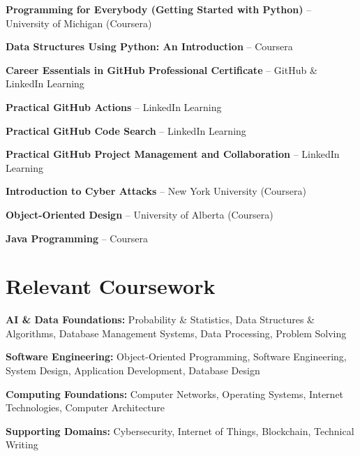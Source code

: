 \documentclass[a4paper,11pt]{article}
\begin{document}
\begin{itemize}[leftmargin=0in, label={}]

\small{

\item{
\textbf{Programming for Everybody (Getting Started with Python)} -- University of Michigan (Coursera)
}

\item{
\textbf{Data Structures Using Python: An Introduction} -- Coursera
}

\item{
\textbf{Career Essentials in GitHub Professional Certificate} -- GitHub \& LinkedIn Learning
}

\item{
\textbf{Practical GitHub Actions} -- LinkedIn Learning
}

\item{
\textbf{Practical GitHub Code Search} -- LinkedIn Learning
}

\item{
\textbf{Practical GitHub Project Management and Collaboration} -- LinkedIn Learning
}

\item{
\textbf{Introduction to Cyber Attacks} -- New York University (Coursera)
}

\item{
\textbf{Object-Oriented Design} -- University of Alberta (Coursera)
}

\item{
\textbf{Java Programming} -- Coursera
}

}

\end{itemize}

\vspace{-10pt}

\section{Relevant Coursework}

\begin{itemize}[leftmargin=0in, label={}]

\small{

\item{
\textbf{AI \& Data Foundations:} Probability \& Statistics, Data Structures \& Algorithms, Database Management Systems, Data Processing, Problem Solving
}

\item{
\textbf{Software Engineering:} Object-Oriented Programming, Software Engineering, System Design, Application Development, Database Design
}

\item{
\textbf{Computing Foundations:} Computer Networks, Operating Systems, Internet Technologies, Computer Architecture
}

\item{
\textbf{Supporting Domains:} Cybersecurity, Internet of Things, Blockchain, Technical Writing
}

}

\end{itemize}
\end{document}
